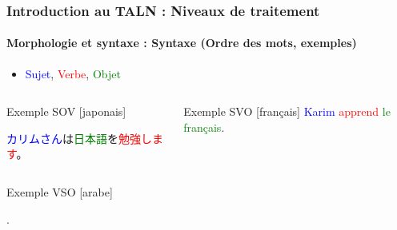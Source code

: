 \documentclass[xcolor=table]{beamer}
\begin{document}
\begin{frame}
\frametitle{Introduction au TALN : Niveaux de traitement}
\framesubtitle{Morphologie et syntaxe : Syntaxe (Ordre des mots, exemples)}

\begin{itemize}
	\item \textcolor{blue}{Sujet}, \textcolor{red}{Verbe}, \textcolor{green}{Objet}
\end{itemize}

\begin{columns}
\begin{column}{0.52\textwidth}
	\begin{exampleblock}{Exemple SOV [japonais]}
		\begin{CJK}{UTF8}{min}
			\textcolor{blue}{カリムさん}は\textcolor{green}{日本語}を\textcolor{red}{勉強します}。
		\end{CJK}
	\end{exampleblock}
\end{column}
%
\begin{column}{0.42\textwidth}
	\begin{exampleblock}{Exemple SVO [français]}
		\textcolor{blue}{Karim} \textcolor{red}{apprend} \textcolor{green}{le français}.
	\end{exampleblock}
\end{column}%
\end{columns}
\begin{columns}
\begin{column}{0.49\textwidth}
	\begin{exampleblock}{Exemple VSO [arabe]}
		\begin{RLtext}
			  
			  
			.
		\end{RLtext}
	\end{exampleblock}
\end{column}
\end{columns}

\end{frame}
\end{document}
